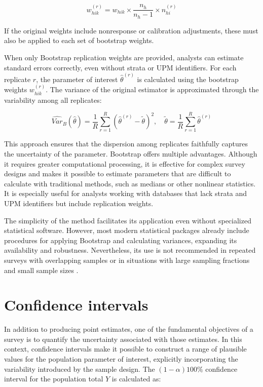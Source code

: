 \documentclass[
  english,
  12pt,
]{book}
\begin{document}
\[
w_{hik}^{(r)} = w_{hik} \times \frac{n_h}{n_h - 1} \times n_{hi}^{(r)}
\]

If the original weights include nonresponse or calibration adjustments, these must also be applied to each set of bootstrap weights.

When only Bootstrap replication weights are provided, analysts can estimate standard errors correctly, even without strata or UPM identifiers. For each replicate \(r\), the parameter of interest \(\hat{\theta}^{(r)}\) is calculated using the bootstrap weights \(w_{hik}^{(r)}\). The variance of the original estimator is approximated through the variability among all replicates:

\[
\widehat{Var}_B(\hat{\theta}) = \frac{1}{R} \sum_{r=1}^{R} \left(\hat{\theta}^{(r)} - \tilde{\theta}\right)^2, \quad
\tilde{\theta} = \frac{1}{R} \sum_{r=1}^{R} \hat{\theta}^{(r)}
\]

This approach ensures that the dispersion among replicates faithfully captures the uncertainty of the parameter. Bootstrap offers multiple advantages. Although it requires greater computational processing, it is effective for complex survey designs and makes it possible to estimate parameters that are difficult to calculate with traditional methods, such as medians or other nonlinear statistics. It is especially useful for analysts working with databases that lack strata and UPM identifiers but include replication weights.

The simplicity of the method facilitates its application even without specialized statistical software. However, most modern statistical packages already include procedures for applying Bootstrap and calculating variances, expanding its availability and robustness. Nevertheless, its use is not recommended in repeated surveys with overlapping samples or in situations with large sampling fractions and small sample sizes \citep{bruch2011variance}.

\section{Confidence intervals}\label{intervalos-de-confianza}

In addition to producing point estimates, one of the fundamental objectives of a survey is to quantify the uncertainty associated with those estimates. In this context, confidence intervals make it possible to construct a range of plausible values for the population parameter of interest, explicitly incorporating the variability introduced by the sample design. The \((1-\alpha)100\%\) confidence interval for the population total \(Y\) is calculated as:
\end{document}
